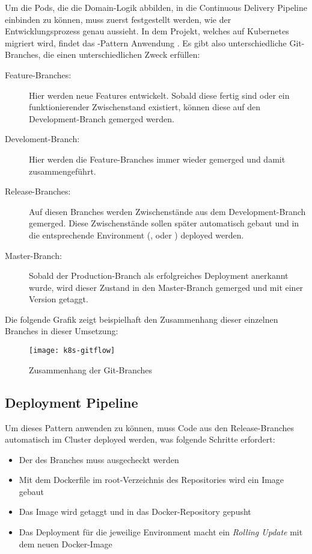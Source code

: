 Um die Pods, die die Domain-Logik abbilden, in die Continuous Delivery Pipeline
einbinden zu können, muss zuerst festgestellt werden, wie der Entwicklungsprozess
genau aussieht.
In dem Projekt, welches auf Kubernetes migriert wird, findet das -Pattern
Anwendung \cite{gitflow}.
Es gibt also unterschiedliche Git-Branches, die einen unterschiedlichen
Zweck erfüllen:
\begin{description}
  \item[Feature-Branches:]
  Hier werden neue Features entwickelt. Sobald diese fertig sind oder ein
  funktionierender Zwischenstand existiert, können diese auf den
  Development-Branch
  gemerged werden.
  \item[Develoment-Branch:]
  Hier werden die Feature-Branches immer wieder gemerged und damit zusammengeführt.
  \item[Release-Branches:]
  Auf diesen Branches werden Zwischenstände aus dem Development-Branch gemerged.
  Diese Zwischenstände sollen später automatisch gebaut und in die entsprechende
  Environment (,  oder
  ) deployed werden.
  \item[Master-Branch:]
  Sobald der Production-Branch als erfolgreiches Deployment anerkannt wurde,
  wird dieser Zustand in den Master-Branch gemerged und mit einer
  Version getaggt.
\end{description}

Die folgende Grafik zeigt beispielhaft den Zusammenhang dieser einzelnen Branches
in dieser Umsetzung:

\begin{figure}[H]
\centering
\texttt{[image: k8s-gitflow]}
\caption{Zusammenhang der Git-Branches}
\end{figure}

\subsection{Deployment Pipeline}

Um dieses Pattern anwenden zu können, muss Code aus den Release-Branches
automatisch im Cluster deployed werden, was folgende Schritte erfordert:

\begin{itemize}
  \item Der  des Branches muss ausgecheckt werden
  \item Mit dem Dockerfile im root-Verzeichnis des Repositories wird ein Image gebaut
  \item Das Image wird getaggt und in das Docker-Repository gepusht
  \item Das Deployment für die jeweilige Environment macht ein \emph{Rolling Update}
  mit dem neuen Docker-Image
\end{itemize}

